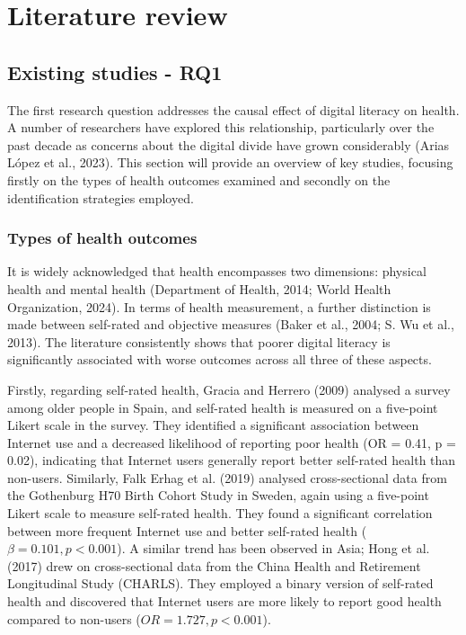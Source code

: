 \chapter{\label{ch:2-litreview}Literature review}

\section{Existing studies - RQ1}
The first research question addresses the causal effect of digital literacy on health. A number of researchers have explored this relationship, particularly over the past decade as concerns about the digital divide have grown considerably (Arias López et al., 2023). This section will provide an overview of key studies, focusing firstly on the types of health outcomes examined and secondly on the identification strategies employed.

\subsection{Types of health outcomes}
It is widely acknowledged that health encompasses two dimensions: physical health and mental health (Department of Health, 2014; World Health Organization, 2024). In terms of health measurement, a further distinction is made between self-rated and objective measures (Baker et al., 2004; S. Wu et al., 2013). The literature consistently shows that poorer digital literacy is significantly associated with worse outcomes across all three of these aspects.

Firstly, regarding self-rated health, Gracia and Herrero (2009) analysed a survey among older people in Spain, and self-rated health is measured on a five-point Likert scale in the survey. They identified a significant association between Internet use and a decreased likelihood of reporting poor health (OR = 0.41, p = 0.02), indicating that Internet users generally report better self-rated health than non-users. Similarly, Falk Erhag et al. (2019) analysed cross-sectional data from the Gothenburg H70 Birth Cohort Study in Sweden, again using a five-point Likert scale to measure self-rated health. They found a significant correlation between more frequent Internet use and better self-rated health ($\beta = 0.101, p < 0.001$). A similar trend has been observed in Asia; Hong et al. (2017) drew on cross-sectional data from the China Health and Retirement Longitudinal Study (CHARLS). They employed a binary version of self-rated health and discovered that Internet users are more likely to report good health compared to non-users ($OR = 1.727, p < 0.001$).

